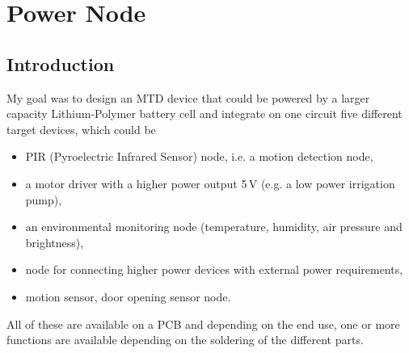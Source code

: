 \section{Power Node}
\subsection{Introduction}
My goal was to design an MTD device that could be powered by a larger capacity Lithium-Polymer battery cell and integrate on one circuit five different target devices, which could be
\begin{itemize}
    \item PIR (Pyroelectric Infrared Sensor) node, i.e. a motion detection node,
    \item a motor driver with a higher power output 5\,\si{\volt} (e.g. a low power irrigation pump),
    \item an environmental monitoring node (temperature, humidity, air pressure and brightness),
    \item node for connecting higher power devices with external power requirements,
    \item motion sensor, door opening sensor node. 
\end{itemize}
All of these are available on a PCB and depending on the end use, one or more functions are available depending on the soldering of the different parts.


